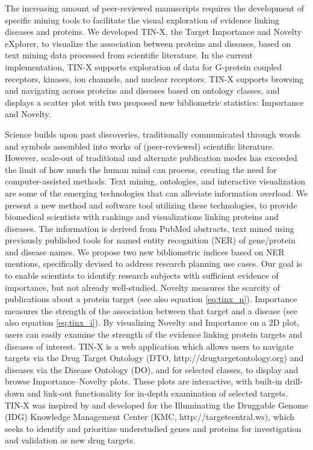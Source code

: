 The increasing amount of peer-reviewed manuscripts requires the development of specific mining tools to facilitate the visual exploration of evidence linking diseases and proteins. We developed TIN-X, the Target Importance and Novelty eXplorer, to visualize the association between proteins and diseases, based on text mining data processed from scientific literature. In the current implementation, TIN-X supports exploration of data for G-protein coupled receptors, kinases, ion channels, and nuclear receptors. TIN-X supports browsing and navigating across proteins and diseases based on ontology classes, and displays a scatter plot with two proposed new bibliometric statistics: Importance and Novelty. 

Science builds upon past discoveries, traditionally communicated through words and symbols assembled into works of (peer-reviewed) scientific literature. However, scale-out of traditional and alternate publication modes has exceeded the limit of how much the human mind can process, creating the need for computer-assisted methods\cite{Hunter2006-om}. Text mining, ontologies, and interactive visualization are some of the emerging technologies that can alleviate information overload. We present a new method and software tool utilizing these technologies, to provide biomedical scientists with rankings and visualizations linking proteins and diseases.  The information is derived from PubMed abstracts, text mined using previously published tools for named entity recognition (NER) of gene/protein and disease names\cite{Pletscher-Frankild2015-oo,Szklarczyk2015-bl}. We propose two new bibliometric indices based on NER mentions, specifically devised to address research planning use cases. Our goal is to enable scientists to identify research subjects with sufficient evidence of importance, but not already well-studied. Novelty measures the scarcity of publications about a protein target (see also equation \ref{eq:tinx_n}). Importance measures the strength of the association between that target and a disease (see also equation \ref{eq:tinx_i}). By visualizing Novelty and Importance on a 2D plot, users can easily examine the strength of the evidence linking protein targets and diseases of interest. TIN-X is a web application which allows users to navigate targets via the Drug Target Ontology (DTO, http://drugtargetontology.org) and diseases via the Disease Ontology (DO)\cite{Kibbe2015-li}, and for selected classes, to display and browse Importance–Novelty plots. These plots are interactive, with built-in drill-down and link-out functionality for in-depth examination of selected targets. TIN-X was inspired by and developed for the Illuminating the Druggable Genome (IDG) Knowledge Management Center (KMC, http://targetcentral.ws), which seeks to identify and prioritize understudied genes and proteins for investigation and validation as new drug targets.

